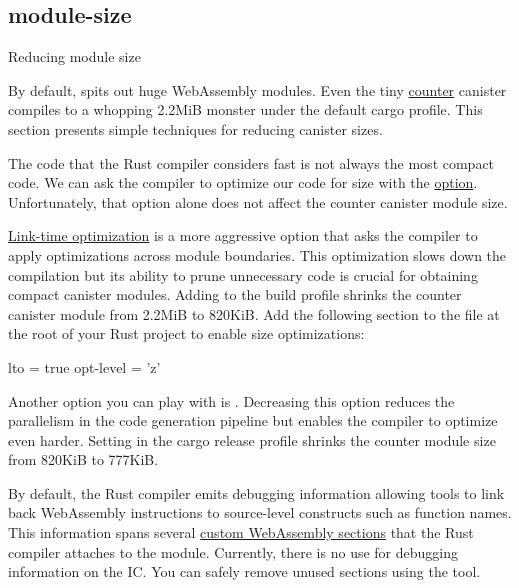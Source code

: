 \documentclass{article}
\begin{document}
\subsection{module-size}{Reducing module size}

By default,  spits out huge WebAssembly modules.
Even the tiny \href{https://github.com/dfinity/cdk-rs/tree/58d276340c2592aa9dcbc4a3e79ef4ac4fca023b/examples/counter/src/counter_rs}{counter} canister compiles to a whopping 2.2MiB monster under the default cargo  profile.
This section presents simple techniques for reducing canister sizes.


The code that the Rust compiler considers fast is not always the most compact code.
We can ask the compiler to optimize our code for size with the  \href{https://doc.rust-lang.org/cargo/reference/profiles.html#opt-level}{option}.
Unfortunately, that option alone does not affect the counter canister module size.

\href{https://doc.rust-lang.org/cargo/reference/profiles.html#lto}{Link-time optimization} is a more aggressive option that asks the compiler to apply optimizations across module boundaries.
This optimization slows down the compilation but its ability to prune unnecessary code is crucial for obtaining compact canister modules.
Adding  to the build profile shrinks the counter canister module from 2.2MiB to 820KiB.
Add the following section to the  file at the root of your Rust project to enable size optimizations:

\begin{code}
lto = true
opt-level = 'z'
\end{code}

Another option you can play with is \href{https://doc.rust-lang.org/cargo/reference/profiles.html#codegen-units}{}.
Decreasing this option reduces the parallelism in the code generation pipeline but enables the compiler to optimize even harder.
Setting  in the cargo release profile shrinks the counter module size from 820KiB to 777KiB.


By default, the Rust compiler emits debugging information allowing tools to link back WebAssembly instructions to source-level constructs such as function names.
This information spans several \href{https://webassembly.github.io/spec/core/binary/modules.html#custom-section}{custom WebAssembly sections} that the Rust compiler attaches to the module.
Currently, there is no use for debugging information on the IC. 
You can safely remove unused sections using the \href{https://github.com/dfinity/ic-wasm}{} tool.
\end{document}
